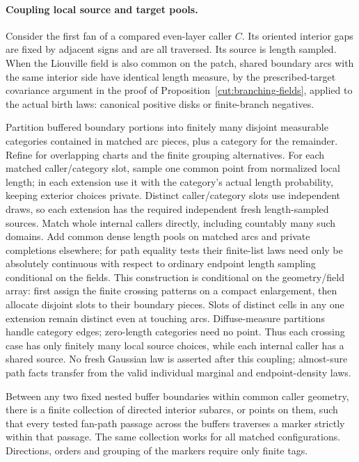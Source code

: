 \paragraph{Coupling local source and target pools.}\label{wall:source-pools}
Consider the first fan of a compared even-layer caller $C$.  Its oriented interior gaps are fixed by adjacent signs and are all traversed.  Its source is length sampled.  When the Liouville field is also common on the patch, shared boundary arcs with the same interior side have identical length measure, by the prescribed-target covariance argument in the proof of Proposition~\ref{cut:branching-fields}, applied to the actual birth laws: canonical positive disks or finite-branch negatives.

Partition buffered boundary portions into finitely many disjoint measurable categories contained in matched arc pieces, plus a category for the remainder.  Refine for overlapping charts and the finite grouping alternatives.  For each matched caller/category slot, sample one common point from normalized local length; in each extension use it with the category's actual length probability, keeping exterior choices private.  Distinct caller/category slots use independent draws, so each extension has the required independent fresh length-sampled sources.  Match whole internal callers directly, including countably many such domains.  Add common dense length pools on matched arcs and private completions elsewhere; for path equality tests their finite-list laws need only be absolutely continuous with respect to ordinary endpoint length sampling conditional on the fields.  This construction is conditional on the geometry/field array: first assign the finite crossing patterns on a compact enlargement, then allocate disjoint slots to their boundary pieces.  Slots of distinct cells in any one extension remain distinct even at touching arcs.  Diffuse-measure partitions handle category edges; zero-length categories need no point.  Thus each crossing case has only finitely many local source choices, while each internal caller has a shared source.  No fresh Gaussian law is asserted after this coupling; almost-sure path facts transfer from the valid individual marginal and endpoint-density laws.

\begin{lemma}\label{wall:markers}
Between any two fixed nested buffer boundaries within common caller geometry, there is a finite collection of directed interior subarcs, or points on them, such that every tested fan-path passage across the buffers traverses a marker strictly within that passage.  The same collection works for all matched configurations.  Directions, orders and grouping of the markers require only finite tags.
\end{lemma}

